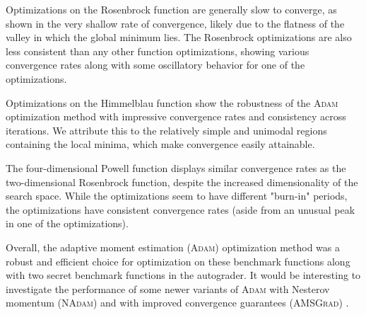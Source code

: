 \documentclass[conference]{IEEEtran}
\begin{document}
Optimizations on the Rosenbrock function are generally slow to converge, as shown in the very shallow rate of convergence, likely due to the flatness of the valley in which the global minimum lies. The Rosenbrock optimizations are also less consistent than any other function optimizations, showing various convergence rates along with some oscillatory behavior for one of the optimizations. 

Optimizations on the Himmelblau function show the robustness of the \textsc{Adam} optimization method with impressive convergence rates and consistency across iterations. We attribute this to the relatively simple and unimodal regions containing the local minima, which make convergence easily attainable.

The four-dimensional Powell function displays similar convergence rates as the two-dimensional Rosenbrock function, despite the increased dimensionality of the search space. While the optimizations seem to have different "burn-in" periods, the optimizations have consistent convergence rates (aside from an unusual peak in one of the optimizations).

Overall, the adaptive moment estimation (\textsc{Adam}) optimization method was a robust and efficient choice for optimization on these benchmark functions along with two secret benchmark functions in the autograder. It would be interesting to investigate the performance of some newer variants of \textsc{Adam} with Nesterov momentum (\textsc{NAdam}) \cite{Dozat2016IncorporatingAdam} and with improved convergence guarantees (\textsc{AMSGrad}) \cite{Reddi2018OnBeyond}.



\end{document}
